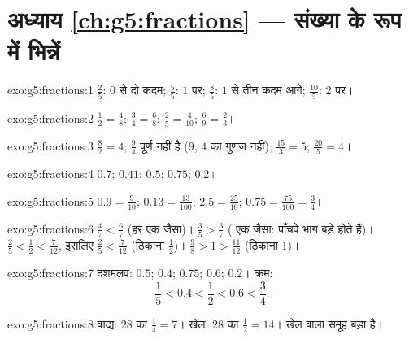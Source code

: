 \section*{अध्याय \ref{ch:g5:fractions} --- संख्या के रूप में भिन्नें}

\begin{solution}{exo:g5:fractions:1}
$\frac25$: $0$ से दो कदम; $\frac55$: $1$ पर; $\frac85$: $1$ से
तीन कदम आगे; $\frac{10}{5}$: $2$ पर।
\end{solution}

\begin{solution}{exo:g5:fractions:2}
$\frac12 = \frac48$; \quad $\frac34 = \frac68$; \quad
$\frac25 = \frac{4}{10}$; \quad $\frac69 = \frac23$।
\end{solution}

\begin{solution}{exo:g5:fractions:3}
$\frac82 = 4$; \quad $\frac94$ पूर्ण नहीं है ($9$, $4$ का गुणज
नहीं); \quad $\frac{15}{3} = 5$; \quad $\frac{20}{5} = 4$।
\end{solution}

\begin{solution}{exo:g5:fractions:4}
$0.7$; \quad $0.41$; \quad $0.5$; \quad $0.75$; \quad $0.2$।
\end{solution}

\begin{solution}{exo:g5:fractions:5}
$0.9 = \frac{9}{10}$; \quad $0.13 = \frac{13}{100}$; \quad
$2.5 = \frac{25}{10}$; \quad $0.75 = \frac{75}{100} = \frac34$।
\end{solution}

\begin{solution}{exo:g5:fractions:6}
$\frac47 < \frac67$ (हर एक जैसा)। \quad
$\frac35 > \frac37$ ( एक जैसा: पाँचवें भाग बड़े होते हैं)। \quad
$\frac25 < \frac12 < \frac{7}{12}$, इसलिए $\frac25 < \frac{7}{12}$
(ठिकाना $\frac12$)। \quad
$\frac98 > 1 > \frac{11}{12}$ (ठिकाना $1$)।
\end{solution}

\begin{solution}{exo:g5:fractions:7}
दशमलव: $0.5$; $0.4$; $0.75$; $0.6$; $0.2$। क्रम:
\[
\frac15 < 0.4 < \frac12 < 0.6 < \frac34 .
\]
\end{solution}

\begin{solution}{exo:g5:fractions:8}
वाद्य: $28$ का $\frac14 = 7$। खेल: $28$ का $\frac12 = 14$।
खेल वाला समूह बड़ा है।
\end{solution}

